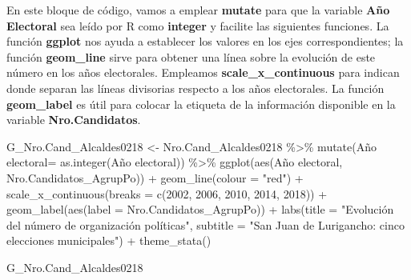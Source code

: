 \documentclass[
]{book}
\newenvironment{Shaded}{\begin{snugshade}}{\end{snugshade}}
\newcommand{\AttributeTok}[1]{\textcolor[rgb]{0.77,0.63,0.00}{#1}}
\newcommand{\DecValTok}[1]{\textcolor[rgb]{0.00,0.00,0.81}{#1}}
\newcommand{\FunctionTok}[1]{\textcolor[rgb]{0.00,0.00,0.00}{#1}}
\newcommand{\NormalTok}[1]{#1}
\newcommand{\OtherTok}[1]{\textcolor[rgb]{0.56,0.35,0.01}{#1}}
\newcommand{\SpecialCharTok}[1]{\textcolor[rgb]{0.00,0.00,0.00}{#1}}
\newcommand{\StringTok}[1]{\textcolor[rgb]{0.31,0.60,0.02}{#1}}
\begin{document}
En este bloque de código, vamos a emplear \textbf{mutate} para que la variable \textbf{Año Electoral} sea leído por R como \textbf{integer} y facilite las siguientes funciones. La función \textbf{ggplot} nos ayuda a establecer los valores en los ejes correspondientes; la función \textbf{geom\_line} sirve para obtener una línea sobre la evolución de este número en los años electorales. Empleamos \textbf{scale\_x\_continuous} para indican donde separan las líneas divisorias respecto a los años electorales. La función \textbf{geom\_label} es útil para colocar la etiqueta de la información disponible en la variable \textbf{Nro.Candidatos}.

\begin{Shaded}
\begin{Highlighting}[]
\NormalTok{G\_Nro.Cand\_Alcaldes0218 }\OtherTok{\textless{}{-}}\NormalTok{ Nro.Cand\_Alcaldes0218 }\SpecialCharTok{\%\textgreater{}\%}
  \FunctionTok{mutate}\NormalTok{(}\StringTok{\textasciigrave{}}\AttributeTok{Año electoral}\StringTok{\textasciigrave{}}\OtherTok{=} \FunctionTok{as.integer}\NormalTok{(}\StringTok{\textasciigrave{}}\AttributeTok{Año electoral}\StringTok{\textasciigrave{}}\NormalTok{)) }\SpecialCharTok{\%\textgreater{}\%}
   \FunctionTok{ggplot}\NormalTok{(}\FunctionTok{aes}\NormalTok{(}\StringTok{\textasciigrave{}}\AttributeTok{Año electoral}\StringTok{\textasciigrave{}}\NormalTok{, Nro.Candidatos\_AgrupPo)) }\SpecialCharTok{+}
  \FunctionTok{geom\_line}\NormalTok{(}\AttributeTok{colour =} \StringTok{"red"}\NormalTok{) }\SpecialCharTok{+}
  \FunctionTok{scale\_x\_continuous}\NormalTok{(}\AttributeTok{breaks =} \FunctionTok{c}\NormalTok{(}\DecValTok{2002}\NormalTok{, }\DecValTok{2006}\NormalTok{, }\DecValTok{2010}\NormalTok{, }\DecValTok{2014}\NormalTok{, }\DecValTok{2018}\NormalTok{)) }\SpecialCharTok{+}
\FunctionTok{geom\_label}\NormalTok{(}\FunctionTok{aes}\NormalTok{(}\AttributeTok{label =}\NormalTok{ Nro.Candidatos\_AgrupPo)) }\SpecialCharTok{+}
  \FunctionTok{labs}\NormalTok{(}\AttributeTok{title =} \StringTok{"Evolución del número de organización políticas"}\NormalTok{,}
       \AttributeTok{subtitle =} \StringTok{"San Juan de Lurigancho: cinco elecciones municipales"}\NormalTok{) }\SpecialCharTok{+}
   \FunctionTok{theme\_stata}\NormalTok{()}
\end{Highlighting}
\end{Shaded}

\begin{Shaded}
\begin{Highlighting}[]
\NormalTok{G\_Nro.Cand\_Alcaldes0218}
\end{Highlighting}
\end{Shaded}
\end{document}

